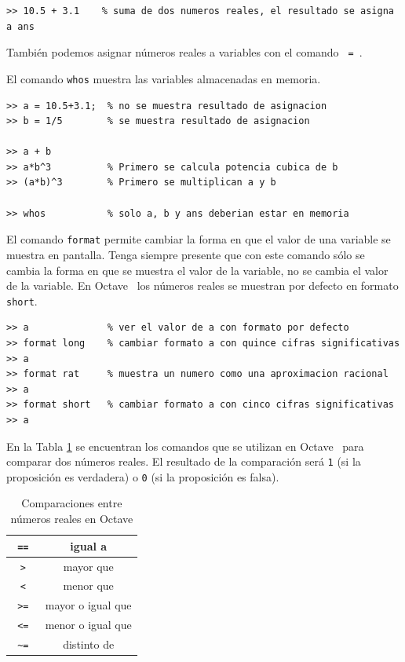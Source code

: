 \documentclass[letter,11pt]{article}
\newcommand\0{\mathbf{0}}
\newcommand{\octave}{{\sc Octave }}
\begin{document}
	\begin{lstlisting}
>> 10.5 + 3.1    % suma de dos numeros reales, el resultado se asigna a ans
	\end{lstlisting}
\newpage

	Tambi\'en podemos asignar n\'umeros reales a variables con el comando \Verb+ = +.
		
	El comando \Verb+whos+ muestra las variables almacenadas en memoria.
	
	\medskip
	\begin{lstlisting}
>> a = 10.5+3.1;  % no se muestra resultado de asignacion
>> b = 1/5        % se muestra resultado de asignacion

>> a + b
>> a*b^3          % Primero se calcula potencia cubica de b
>> (a*b)^3        % Primero se multiplican a y b

>> whos           % solo a, b y ans deberian estar en memoria
	\end{lstlisting}
	
	\medskip
				
	El comando \Verb+format+ permite cambiar la forma en que el valor
	de una variable se muestra en pantalla. Tenga siempre presente
	que con este comando s\'olo se cambia la forma en que se muestra el valor de
	la variable, no se cambia el valor de la variable.
	En \octave\, los n\'umeros reales se muestran por defecto en formato \Verb+short+.
    \medskip

\begin{lstlisting}
>> a              % ver el valor de a con formato por defecto
>> format long    % cambiar formato a con quince cifras significativas
>> a
>> format rat     % muestra un numero como una aproximacion racional
>> a
>> format short   % cambiar formato a con cinco cifras significativas
>> a
\end{lstlisting}

\medskip
	
	En la Tabla \ref{table:compare} se encuentran los comandos que se utilizan en
	\octave\, para comparar dos n\'umeros reales. El resultado de la comparaci\'on
	ser\'a \Verb+1+ (si la proposici\'on es verdadera) o \Verb+0+ (si la proposici\'on es falsa).	
	
	\begin{table}[ht]
\begin{center}
		\begin{tabular}{|c|c|}\hline
			\Verb+ == + & igual a\\\hline
			\Verb+ > + & mayor que\\\hline
			\Verb+ < + & menor que\\\hline
			\Verb+ >= + & mayor o igual que\\\hline
			\Verb+ <= + & menor o igual que\\\hline
			\Verb+ ~= + & distinto de\\\hline
		\end{tabular}
\end{center} 			
		\caption{Comparaciones entre n\'umeros reales en \octave}\label{table:compare}
	\end{table}
\end{document}
